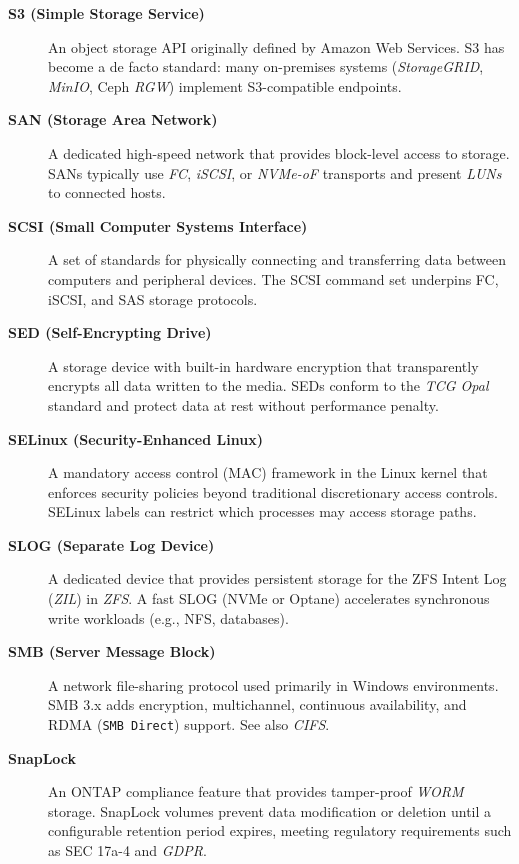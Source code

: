 \begin{description}

\item[\textbf{S3 (Simple Storage Service)}]
An object storage API originally defined by Amazon Web Services. S3 has
become a de facto standard: many on-premises systems (\textit{StorageGRID},
\textit{MinIO}, Ceph \textit{RGW}) implement S3-compatible endpoints.

\item[\textbf{SAN (Storage Area Network)}]
A dedicated high-speed network that provides block-level access to storage.
SANs typically use \textit{FC}, \textit{iSCSI}, or \textit{NVMe-oF}
transports and present \textit{LUNs} to connected hosts.

\item[\textbf{SCSI (Small Computer Systems Interface)}]
A set of standards for physically connecting and transferring data between
computers and peripheral devices. The SCSI command set underpins FC, iSCSI,
and SAS storage protocols.

\item[\textbf{SED (Self-Encrypting Drive)}]
A storage device with built-in hardware encryption that transparently
encrypts all data written to the media. SEDs conform to the \textit{TCG
Opal} standard and protect data at rest without performance penalty.

\item[\textbf{SELinux (Security-Enhanced Linux)}]
A mandatory access control (MAC) framework in the Linux kernel that enforces
security policies beyond traditional discretionary access controls.
SELinux labels can restrict which processes may access storage paths.

\item[\textbf{SLOG (Separate Log Device)}]
A dedicated device that provides persistent storage for the ZFS Intent Log
(\textit{ZIL}) in \textit{ZFS}. A fast SLOG (NVMe or Optane) accelerates
synchronous write workloads (e.g., NFS, databases).

\item[\textbf{SMB (Server Message Block)}]
A network file-sharing protocol used primarily in Windows environments. SMB
3.x adds encryption, multichannel, continuous availability, and RDMA
(\texttt{SMB Direct}) support. See also \textit{CIFS}.

\item[\textbf{SnapLock}]
An ONTAP compliance feature that provides tamper-proof \textit{WORM}
storage. SnapLock volumes prevent data modification or deletion until a
configurable retention period expires, meeting regulatory requirements such
as SEC 17a-4 and \textit{GDPR}.


\end{description}
